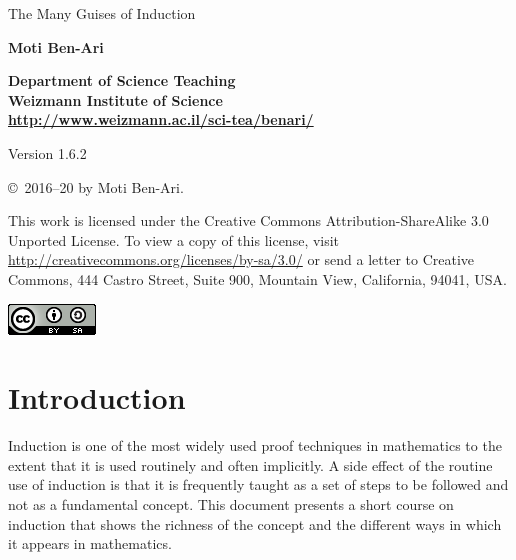 \documentclass[11pt,a4paper]{report}
\begin{document}
\thispagestyle{empty}

\begin{center}
\begin{Huge}
\begin{bfseries}
The Many Guises of Induction
\end{bfseries}
\end{Huge}

\bigskip
\bigskip
\bigskip

\textbf{\LARGE Moti Ben-Ari}

\bigskip

\textbf{\Large Department of Science Teaching\\
Weizmann Institute of Science\\
\bigskip
\url{http://www.weizmann.ac.il/sci-tea/benari/}
}

\bigskip
\bigskip


\begin{Large}
Version 1.6.2
\end{Large}
\end{center}

\vfill

\begin{center}
\copyright{}\  2016--20 by Moti Ben-Ari.
\end{center}

This work is licensed under the Creative Commons Attribution-ShareAlike 3.0 Unported License. To view a copy of this license, visit \url{http://creativecommons.org/licenses/by-sa/3.0/} or send a letter to Creative Commons, 444 Castro Street, Suite 900, Mountain View, California, 94041, USA.

\begin{center}
\includegraphics[width=.2\textwidth]{../../by-sa.png}
\end{center}

\newpage

\setcounter{tocdepth}{0}
\tableofcontents

\chapter{Introduction}\label{s.intro}

Induction is one of the most widely used proof techniques in mathematics to the extent that it is used routinely and often implicitly. A side effect of the routine use of induction is that it is frequently taught as a set of steps to be followed and not as a fundamental concept. This document presents a short course on induction that shows the richness of the concept and the different ways in which it appears in mathematics.
\end{document}
